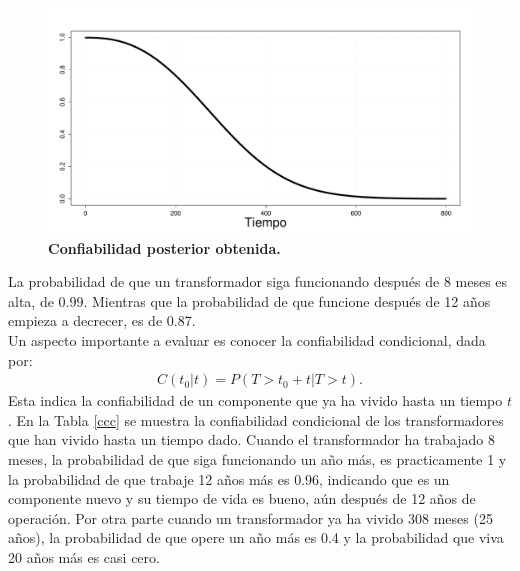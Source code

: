 \begin{figure}
\begin{center}
\includegraphics[scale=0.25]{ConPos.pdf}
\end{center}
\vspace{-0.5 cm} \caption{{\bf Confiabilidad posterior obtenida.}\label{CPos}}
\end{figure}


\noindent La probabilidad de que un transformador siga funcionando despu\'es de 8 meses es alta, de 0.99. Mientras que la probabilidad de que funcione  despu\'es de 12 a\~nos empieza a  decrecer, es de 0.87.\\
\noindent Un aspecto importante a evaluar es conocer la confiabilidad condicional, dada por: 
\vspace{-.1cm}
\begin{eqnarray*}
C(t_0|t)=P(T>t_0+t|T>t).
\end{eqnarray*}
\noindent  Esta indica la confiabilidad de un componente que ya ha vivido hasta un tiempo $t$. En la  Tabla \ref{ccc} se muestra la confiabilidad condicional de los transformadores que han vivido hasta un tiempo dado. 
\noindent Cuando el transformador ha trabajado 8 meses, la probabilidad de que siga funcionando un a\~no m\'as, es practicamente 1 y la probabilidad de que trabaje 12 a\~nos m\'as es 0.96, indicando que es un componente nuevo y su tiempo de vida es bueno, a\'un despu\'es de 12 a\~nos de operaci\'on. Por otra parte cuando un transformador ya ha vivido 308 meses (25 a\~nos), la probabilidad de que opere un a\~no m\'as es 0.4 y la probabilidad que viva 20 a\~nos m\'as es casi cero.

